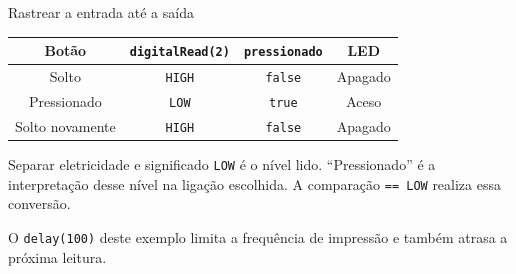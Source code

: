 \begin{frame}[t]{Rastrear a entrada até a saída}
\small
\begin{center}\begin{tabular}{cccc}\toprule
Botão & \texttt{digitalRead(2)} & \texttt{pressionado} & LED\\\midrule
Solto & \texttt{HIGH} & \texttt{false} & Apagado\\
Pressionado & \texttt{LOW} & \texttt{true} & Aceso\\
Solto novamente & \texttt{HIGH} & \texttt{false} & Apagado\\\bottomrule
\end{tabular}\end{center}
\begin{block}{Separar eletricidade e significado}
\texttt{LOW} é o nível lido. ``Pressionado'' é a interpretação desse nível na ligação escolhida. A comparação \texttt{== LOW} realiza essa conversão.
\end{block}
\small O \texttt{delay(100)} deste exemplo limita a frequência de impressão e também atrasa a próxima leitura.
\end{frame}
